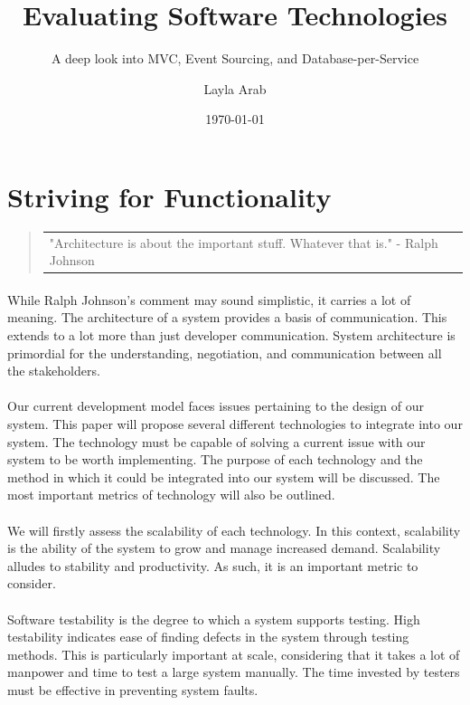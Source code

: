 \documentclass{turabian-researchpaper}
\title{Evaluating Software Technologies}
\subtitle{A deep look into MVC, Event Sourcing, and Database-per-Service}
\author{Layla Arab}
\date{\today}
\begin{document}
\maketitle


\section{Striving for Functionality}

\begin{quotation}
\begin{tabular}{|p{15cm}}
     "Architecture is about the important stuff. Whatever that is."  - Ralph Johnson\cite{fowler}
\end{tabular}
\end{quotation}

\paragraph{}
While Ralph Johnson’s comment may sound simplistic, it carries a lot of meaning. The architecture of a system provides a basis of communication.\cite{nirmalya_karam_mohsin_2018} This extends to a lot more than just developer communication. System architecture is primordial for the understanding, negotiation, and communication between all the stakeholders.
\par
\paragraph{}
Our current development model faces issues pertaining to the design of our system. This paper will propose several different technologies to integrate into our system. The technology must be capable of solving a current issue with our system to be worth implementing. The purpose of each technology and the method in which it could be integrated into our system will be discussed. The most important metrics of technology will also be outlined.
\par
\paragraph{}
We will firstly assess the scalability of each technology. In this context, scalability is the ability of the system to grow and manage increased demand. \cite{techopedia.com} Scalability alludes to stability and productivity. As such, it is an important metric to consider.
\par
\paragraph{}
Software testability is the degree to which a system supports testing. High testability indicates ease of finding defects in the system through testing methods.\cite{wikipedia_2019}
This is particularly important at scale, considering that it takes a lot of manpower and time to test a large system manually. The time invested by testers must be effective in preventing system faults.
\par
\end{document}
